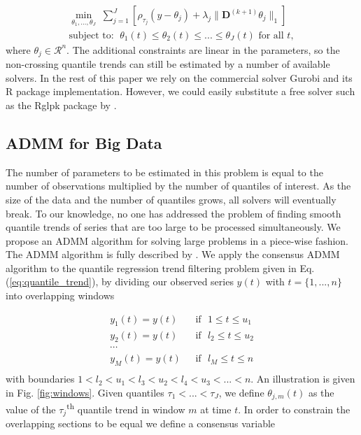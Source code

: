 \documentclass[12pt]{article}
\begin{document}
	\begin{eqnarray}
	\label{eq:noncross_trend}
	\underset{\theta_1, ..., \theta_J}{\min}\; \sum_{j=1}^J \left [\rho_{\tau_j}(y - \theta_{j}) + 
	\lambda_j \lVert \mathbf{D}^{(k+1)} \theta_j \rVert_1 \right ] \\
	 \text{subject to: }\; \theta_{1}(t) \le \theta_{2}(t) \le ... \le \theta_{J}(t) \text{ for all } t,
	\end{eqnarray}	
	where $\theta_j \in \mathcal{R}^n$. The additional constraints are linear in the parameters, so the non-crossing quantile trends can still be estimated by a number of available solvers. In the rest of this paper we rely on the commercial solver Gurobi \citep{gurobi} and its R package implementation. However, we could easily substitute a free solver such as the Rglpk package by \cite{rglpk}. 
	
	\subsection{ADMM for Big Data}
	
	The number of parameters to be estimated in this problem is equal to the number of observations multiplied by the number of quantiles of interest. As the size of the data and the number of quantiles grows, all solvers will eventually break. To our knowledge, no one has addressed the problem of finding smooth quantile trends of series that are too large to be processed simultaneously. We propose an ADMM algorithm for solving large problems in a piece-wise fashion. The ADMM algorithm \citep{gabay1975dual, glowinski1975approximation} is fully described by \cite{boyd2011distributed}. We apply the consensus ADMM algorithm to the quantile regression trend filtering problem given in Eq. (\ref{eq:quantile_trend}), by dividing our observed series $y(t)$ with $t = \{1, ..., n\}$ into overlapping windows 
	
	\begin{align*}
	y_1(t) = y(t) & \mbox{~~if~~} 1 \le t \le u_{1}\\
	y_2(t) = y(t) & \mbox{~~if~~} l_{2} \le t \le u_{2} \\
	\cdots & \\
	y_M(t) = y(t) & \mbox{~~if~~} l_{M} \le t \le  n\\
	\end{align*}
	 with boundaries $1 < l_{2} < u_{1} < l_{3} < u_{2} < l_{4} < u_{3} < ...< n$. An illustration is given in Fig. \ref{fig:windows}. Given quantiles $\tau_1 < ... < \tau_J$, we define $\theta_{j,m}(t)$ as the value of the $\tau_j$\textsuperscript{th} quantile trend in window $m$ at time $t$. In order to constrain the overlapping sections to be equal we define a consensus variable
	 
\end{document}
